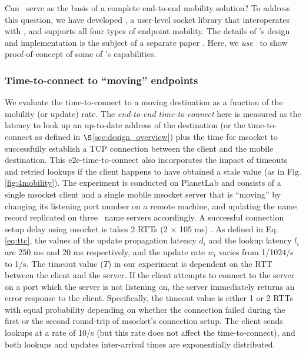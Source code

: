 Can \auspice\ serve as the basis of a complete end-to-end mobility solution? To address this question, we have developed \msocket, a user-level socket library that interoperates with \auspice, and supports all four types of endpoint mobility. %
The details of \msocket's design and implementation is the subject of a separate paper \cite{msocketTR}. Here, we {\em use} \msocket\ to show proof-of-concept of some of \auspice's capabilities.

\subsubsection{Time-to-connect to ``moving'' endpoints}
\label{sec:ttc_exp}

We evaluate the time-to-connect to a moving destination as a function of the mobility (or update) rate. The {\em end-to-end time-to-connect}  here is measured as the latency to look up an up-to-date address of the destination (or the time-to-connect as defined in $\S$\ref{sec:design_overview}) plus the time for msocket to successfully establish a TCP connection between the client and the mobile destination. This e2e-time-to-connect also incorporates the impact of timeouts and retried lookups if the client happens to have obtained a stale value (as in Fig. \ref{fig:4mobility}). The experiment is conducted on PlanetLab and consists of a single msocket client and a single mobile msocket server that is ``moving'' by changing its listening port number on a remote machine, and updating the name record replicated on three \auspice\ name servers accordingly. 
A successful connection setup delay using msocket is takes 2 RTTs (2 $\times$ 105 ms)  \cite{msocketTR}. 
As defined in Eq. \ref{eq:ttc}, the values of the update propagation latency $d_i$ and the lookup latency $l_i$ are 250 ms and 20 ms respectively, and the update rate $w_i$ varies from 1/1024/s to 1/s.
The timeout value ($T$) in our experiment is dependent on the RTT between the client and the server. If the client attempts to connect to the server on a port which the server is not listening on, the server immediately returns an error response to the client. Specifically, the timeout value is either 1 or 2 RTTs with equal probability depending on whether the connection failed during the first or the second round-trip of msocket's connection setup.
The client sends lookups at a rate of 10/s (but this rate does not affect the time-to-connect), and both lookups and updates inter-arrival times are exponentially distributed.


